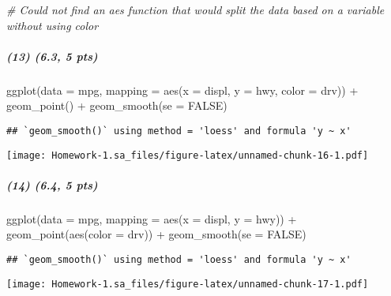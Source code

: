 \documentclass[
]{article}
\newenvironment{Shaded}{\begin{snugshade}}{\end{snugshade}}
\newcommand{\AttributeTok}[1]{\textcolor[rgb]{0.77,0.63,0.00}{#1}}
\newcommand{\CommentTok}[1]{\textcolor[rgb]{0.56,0.35,0.01}{\textit{#1}}}
\newcommand{\ConstantTok}[1]{\textcolor[rgb]{0.00,0.00,0.00}{#1}}
\newcommand{\FunctionTok}[1]{\textcolor[rgb]{0.00,0.00,0.00}{#1}}
\newcommand{\NormalTok}[1]{#1}
\newcommand{\SpecialCharTok}[1]{\textcolor[rgb]{0.00,0.00,0.00}{#1}}
\begin{document}
\begin{Shaded}
\begin{Highlighting}[]
\CommentTok{\# Could not find an aes function that would split the data based on a variable without using color}
\end{Highlighting}
\end{Shaded}

\hypertarget{pts-2}{%
\subparagraph{(13) (6.3, 5 pts)}\label{pts-2}}

\begin{Shaded}
\begin{Highlighting}[]
\FunctionTok{ggplot}\NormalTok{(}\AttributeTok{data =}\NormalTok{ mpg, }\AttributeTok{mapping =} \FunctionTok{aes}\NormalTok{(}\AttributeTok{x =}\NormalTok{ displ, }\AttributeTok{y =}\NormalTok{ hwy, }\AttributeTok{color =}\NormalTok{ drv)) }\SpecialCharTok{+} 
  \FunctionTok{geom\_point}\NormalTok{() }\SpecialCharTok{+} 
  \FunctionTok{geom\_smooth}\NormalTok{(}\AttributeTok{se =} \ConstantTok{FALSE}\NormalTok{)}
\end{Highlighting}
\end{Shaded}

\begin{verbatim}
## `geom_smooth()` using method = 'loess' and formula 'y ~ x'
\end{verbatim}

\texttt{[image: Homework-1.sa\_files/figure-latex/unnamed-chunk-16-1.pdf]}

\hypertarget{pts-3}{%
\subparagraph{(14) (6.4, 5 pts)}\label{pts-3}}

\begin{Shaded}
\begin{Highlighting}[]
\FunctionTok{ggplot}\NormalTok{(}\AttributeTok{data =}\NormalTok{ mpg, }\AttributeTok{mapping =} \FunctionTok{aes}\NormalTok{(}\AttributeTok{x =}\NormalTok{ displ, }\AttributeTok{y =}\NormalTok{ hwy)) }\SpecialCharTok{+} 
  \FunctionTok{geom\_point}\NormalTok{(}\FunctionTok{aes}\NormalTok{(}\AttributeTok{color =}\NormalTok{ drv)) }\SpecialCharTok{+} 
  \FunctionTok{geom\_smooth}\NormalTok{(}\AttributeTok{se =} \ConstantTok{FALSE}\NormalTok{)}
\end{Highlighting}
\end{Shaded}

\begin{verbatim}
## `geom_smooth()` using method = 'loess' and formula 'y ~ x'
\end{verbatim}

\texttt{[image: Homework-1.sa\_files/figure-latex/unnamed-chunk-17-1.pdf]}
\end{document}

